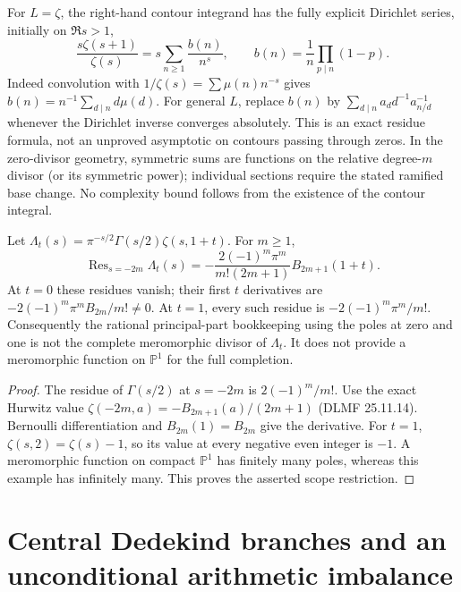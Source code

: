 For $L=\zeta$, the right-hand contour integrand has the fully explicit
Dirichlet series, initially on $\Re s>1$,
\[
 \frac{s\zeta(s+1)}{\zeta(s)}
 =s\sum_{n\ge1}\frac{b(n)}{n^s},\qquad
 b(n)=\frac1n\prod_{p\mid n}(1-p).
\]
Indeed convolution with $1/\zeta(s)=\sum\mu(n)n^{-s}$ gives
$b(n)=n^{-1}\sum_{d\mid n}d\mu(d)$. For general $L$, replace
$b(n)$ by $\sum_{d\mid n}a_d d^{-1}a^{-1}_{n/d}$ whenever the
Dirichlet inverse converges absolutely. This is an exact residue
formula, not an unproved asymptotic on contours passing through zeros.
In the zero-divisor geometry, symmetric sums are functions on the relative
degree-$m$ divisor (or its symmetric power); individual sections require
the stated ramified base change. No complexity bound follows from the
existence of the contour integral.

\begin{proposition}
Let $\Lambda_t(s)=\pi^{-s/2}\Gamma(s/2)\zeta(s,1+t)$. For $m\ge1$,
\[
 \operatorname{Res}_{s=-2m}\Lambda_t(s)
 =-\frac{2(-1)^m\pi^m}{m!(2m+1)}B_{2m+1}(1+t).
\]
At $t=0$ these residues vanish; their first $t$ derivatives are
$-2(-1)^m\pi^mB_{2m}/m!\ne0$. At $t=1$, every such residue is
$-2(-1)^m\pi^m/m!$. Consequently the rational principal-part
bookkeeping using the poles at zero and one is not the complete
meromorphic divisor of $\Lambda_t$. It does not provide a meromorphic
function on $\mathbb P^1$ for the full completion.
\end{proposition}
\begin{proof}
The residue of $\Gamma(s/2)$ at $s=-2m$ is $2(-1)^m/m!$.
Use the exact Hurwitz value
$\zeta(-2m,a)=-B_{2m+1}(a)/(2m+1)$ (DLMF 25.11.14).
Bernoulli differentiation and $B_{2m}(1)=B_{2m}$ give the derivative.
For $t=1$, $\zeta(s,2)=\zeta(s)-1$, so its value at every negative
even integer is $-1$. A meromorphic function on compact
$\mathbb P^1$ has finitely many poles, whereas this example has
infinitely many. This proves the asserted scope restriction.
\end{proof}


\section{Central Dedekind branches and an unconditional arithmetic imbalance}
\label{sec:analytic-central-puiseux}

